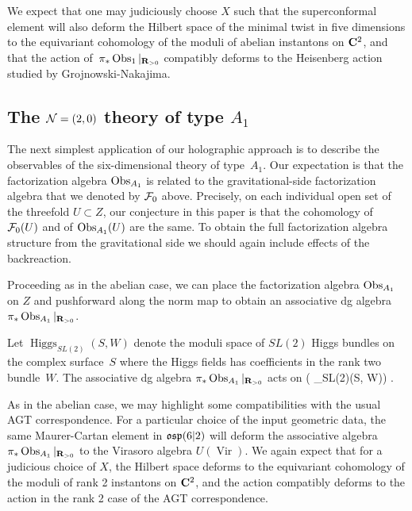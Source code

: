 We expect that one may judiciously choose $X$ such that the superconformal element will also deform the Hilbert space of the minimal twist in five dimensions to the equivariant cohomology of the moduli of abelian instantons on $\mathbf{C}^{2}$, and that the action of~$\pi_{*}\operatorname{Obs}_{1}|_{\mathbf{R}_{>0}}$ compatibly deforms to the Heisenberg action studied by Grojnowski-Nakajima.

\subsection*{The $\mathcal N=(2,0)$ theory of type $A_1$} 


The next simplest application of our holographic approach is to describe the observables of the six-dimensional theory of type~$A_1$.
Our expectation is that the factorization algebra $\operatorname{Obs}_{A_1}$ is related to the gravitational-side factorization algebra that we denoted by $\mathcal F_0$ above.
Precisely, on each individual open set of the threefold $U \subset Z$, our conjecture in this paper is that the cohomology of $\mathcal F_0(U)$ and of $\operatorname{Obs}_{A_1}(U)$ are the same.
To obtain the full factorization algebra structure from the gravitational side we should again include effects of the backreaction. 

Proceeding as in the abelian case, we can place the factorization algebra $\operatorname{Obs}_{A_1}$ on $Z$ and pushforward along the norm map to obtain an associative dg algebra $\pi_{*} \operatorname{Obs}_{A_1}|_{\mathbf{R}_{>0}}$.

\begin{conj}
Let $\operatorname{Higgs}_{SL(2)} (S,W)$ denote the moduli space of $SL(2)$ Higgs bundles on the complex surface~$S$ where the Higgs fields has coefficients in the rank two bundle~$W$.
The associative dg algebra $\pi_{*} \operatorname{Obs}_{A_1}|_{\mathbf{R}_{>0}}$ acts on
  \beqn
  \cO \left (  _{SL(2)}(S, W)\right) .
  \eeqn
\end{conj}

As in the abelian case, we may highlight some compatibilities with the usual AGT correspondence. 
For a particular choice of the input geometric data, the same Maurer-Cartan element in $\mathfrak{osp}(6|2)$ will deform the associative algebra $\pi_{*}\operatorname{Obs}_{A_{1}}|_{\mathbf{R}_{>0}}$ to the Virasoro algebra $U(\operatorname{Vir})$. We again expect that for a judicious choice of $X$, the Hilbert space deforms to the equivariant cohomology of the moduli of rank 2 instantons on $\mathbf{C}^{2}$, and the action compatibly deforms to the action in the rank 2 case of the AGT correspondence.

